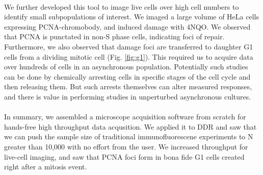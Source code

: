 \paragraph*{} We further developed this tool to image live cells over high cell numbers to identify small subpopulations of interest. We imaged a large volume of HeLa cells expressing PCNA-chromobody, and induced damage with 4NQO. We observed that PCNA is punctated in non-S phase cells, indicating foci of repair. Furthermore, we also observed that damage foci are transferred to daughter G1 cells from a dividing mitotic cell (Fig. \ref{fig:g1}). This required us to acquire data over hundreds of cells in an asynchronous population. Potentially such studies can be done by chemically arresting cells in specific stages of the cell cycle and then releasing them. But such arrests themselves can alter measured responses, and there is value in performing studies in unperturbed asynchronous cultures.

\paragraph*{} In summary, we assembled a microscope acquisition software from scratch for hands-free high throughput data acqusition. We applied it to DDR and saw that we can push the sample size of traditional immunofluorescene experiments to N greater than 10,000 with no effort from the user. We increased throughput for live-cell imaging, and saw that PCNA foci form in bona fide G1 cells created right after a mitosis event.
